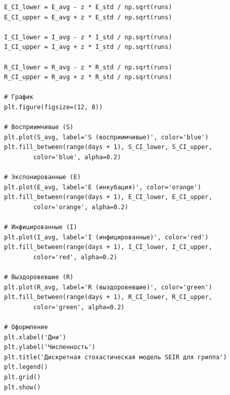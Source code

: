 \documentclass[a4paper, 14pt]{extreport}
\begin{document}
\begin{verbatim}
E_CI_lower = E_avg - z * E_std / np.sqrt(runs)
E_CI_upper = E_avg + z * E_std / np.sqrt(runs)

I_CI_lower = I_avg - z * I_std / np.sqrt(runs)
I_CI_upper = I_avg + z * I_std / np.sqrt(runs)

R_CI_lower = R_avg - z * R_std / np.sqrt(runs)
R_CI_upper = R_avg + z * R_std / np.sqrt(runs)

# График
plt.figure(figsize=(12, 8))

# Восприимчивые (S)
plt.plot(S_avg, label='S (восприимчивые)', color='blue')
plt.fill_between(range(days + 1), S_CI_lower, S_CI_upper, 
		color='blue', alpha=0.2)

# Экспонированные (E)
plt.plot(E_avg, label='E (инкубация)', color='orange')
plt.fill_between(range(days + 1), E_CI_lower, E_CI_upper, 
		color='orange', alpha=0.2)

# Инфицированные (I)
plt.plot(I_avg, label='I (инфицированные)', color='red')
plt.fill_between(range(days + 1), I_CI_lower, I_CI_upper, 
		color='red', alpha=0.2)

# Выздоровевшие (R)
plt.plot(R_avg, label='R (выздоровевшие)', color='green')
plt.fill_between(range(days + 1), R_CI_lower, R_CI_upper, 
		color='green', alpha=0.2)

# Оформление
plt.xlabel('Дни')
plt.ylabel('Численность')
plt.title('Дискретная стохастическая модель SEIR для гриппа')
plt.legend()
plt.grid()
plt.show()
\end{verbatim}
\end{document}
